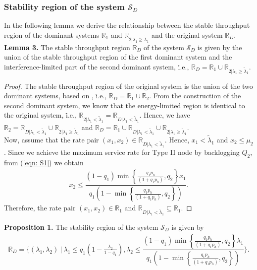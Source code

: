 \documentclass[draftcls,12pt,onecolumn]{IEEEtran}
\begin{document}
\subsubsection{Stability region of the system $\mathcal{S}_D$}
In the following lemma we derive the relationship between the stable throughput region of the dominant systems $\mathbb{R}_1$ and $\mathbb{R}_{2 |  \lambda_1 \geq \tilde{\lambda}_1 }$ and the original system $\mathbb{R}_D$.\\ 
\indent \textbf{Lemma 3.} The stable throughput region $\mathbb{R}_D$ of the system $\mathcal{S}_D$ is given by the union of the stable throughput region of the first dominant system and the interference-limited part of the second dominant system, \.i.e., 
$
\mathbb{R}_D= \mathbb{R}_1 \cup \mathbb{R}_{2 |  \lambda_1 \geq \tilde{\lambda}_1 }.
$
\begin{proof}
The stable throughput region of the original system is the union of the two dominant systems, based on \cite{rao1988stability}, \.i.e., $\mathbb{R}_D= \mathbb{R}_1 \cup \mathbb{R}_{2}$. From the construction of the second dominant system, we know that the energy-limited region is identical to the original system, \.i.e., $\mathbb{R}_{2 |  \lambda_1 < \tilde{\lambda}_1 } = \mathbb{R}_{D |  \lambda_1 < \tilde{\lambda}_1 }$. Hence, we have $\mathbb{R}_2 = \mathbb{R}_{D |  \lambda_1 < \tilde{\lambda}_1 } \cup \mathbb{R}_{2 |  \lambda_1 \geq \tilde{\lambda}_1 }$ and $ \mathbb{R}_D= \mathbb{R}_1 \cup \mathbb{R}_{D |  \lambda_1 < \tilde{\lambda}_1 } \cup \mathbb{R}_{2 |  \lambda_1 \geq \tilde{\lambda}_1 }.
$\\ \indent Now, assume that the rate pair $(x_1, x_2) \in \mathbb{R}_{D |  \lambda_1 < \tilde{\lambda}_1 }$. Hence, $ x_1 < \tilde{\lambda}_1 $ and $x_2 \leq \mu_2$. Since we achieve the maximum service rate for Type II node by backlogging $Q_2$, from (\ref{eqn: S1}) we obtain 
\begin{align}
x_2 \leq \dfrac{(1-q_1) \min \left\lbrace \frac{q_1 p_h}{ (1+ q_1 p_h)}, q_2 \right\rbrace x_1}{q_1 \left( 1- \min \left\lbrace \frac{q_1 p_h}{ (1+ q_1 p_h)}, q_2 \right\rbrace \right)}. 
\end{align}
Therefore, the rate pair $(x_1, x_2) \in \mathbb{R}_1$ and $ \mathbb{R}_{D |  \lambda_1 < \tilde{\lambda}_1 } \subseteq \mathbb{R}_1 $. 
\end{proof}
\indent \textbf{Proposition 1.} The stability region of the system $ \mathcal{S}_D$ is given by 
\begin{align}\label{eqn: prop 1 } 
\mathbb{R}_D= \bigg\{  (\lambda_1, \lambda_2) \ \big | \ \lambda_1 \leq  q_1 \left( 1- \frac{\lambda_2}{1-q_1}\right),  \lambda_2 \leq  \dfrac{(1-q_1) \min \left\lbrace \frac{q_1 p_h}{ (1+ q_1 p_h)}, q_2 \right\rbrace \lambda_1}{q_1 \left( 1- \min \left\lbrace \frac{q_1 p_h}{ (1+ q_1 p_h)}, q_2 \right\rbrace \right)} \bigg\}. 
\end{align}
\end{document}
